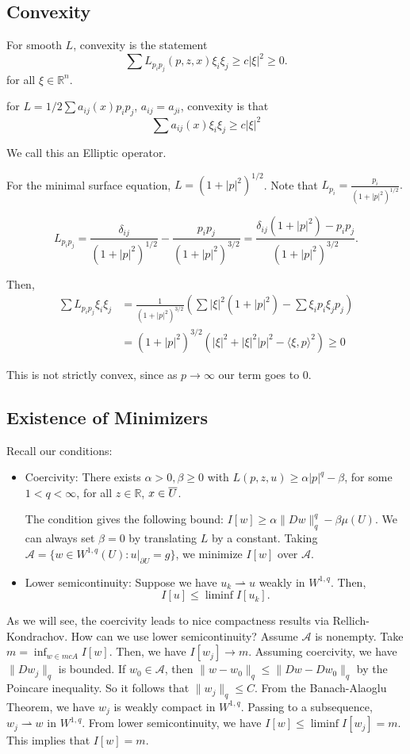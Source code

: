 \documentclass[12pt]{scrartcl}
\newcommand{\R}{\mathbb{R}}
\newcommand{\<}{\langle}
\renewcommand{\>}{\rangle}
\let \mc \mathcal
\begin{document}
\subsection{Convexity}
For smooth $L$, convexity is the statement 
$$\sum L_{p_i p_j}(p, z, x) \xi_i \xi_j \ge c|\xi|^2 \ge 0.$$
for all $\xi \in \R^n$.  
\begin{example} for $L = 1/2 \sum a_{ij}(x) p_i p_j$, $a_{ij} = a_{ji}$, convexity is that 
$$\sum a_{ij}(x) \xi_i \xi_j \ge c |\xi|^2$$

We call this an Elliptic operator.
\end{example}
\begin{example} For the minimal surface equation, $L = (1 + |p|^2)^{1/2}$.  Note that $L_{p_i} = \frac{p_i}{(1 + |p|^2)^{1/2}}.$  

$$L_{p_ip_j} = \frac{\delta_{ij}}{(1 + |p|^2)^{1/2}} - \frac{p_ip_j}{(1 + |p|^2)^{3/2}} = \frac{\delta_{ij}(1 + |p|^2) - p_ip_j}{(1 + |p|^2)^{3/2}}.$$

Then,
\begin{align*}
\sum L_{p_ip_j} \xi_i \xi_j &= \frac{1}{(1 + |p|^2)^{3/2}}\left ( \sum |\xi|^2 (1 + |p|^2) - \sum \xi_i p_i \xi_j p_j\right )\\
&= (1 + |p|^2)^{3/2} (|\xi|^2 + |\xi|^2 |p|^2 - \<\xi, p\>^2) \ge 0
\end{align*}

This is not strictly convex, since as $p \to \infty$ our term goes to $0$.
\end{example}
\subsection{Existence of Minimizers}
Recall our conditions:
\begin{itemize}
\item Coercivity: There exists $\alpha > 0, \beta \ge 0$ with $L(p, z, u) \ge \alpha |p|^q - \beta$, for some $1 < q < \infty$, for all $z \in \R$, $x \in \overline U$.  

The condition gives the following bound: $I[w] \ge \alpha \|Dw\|_q^q - \beta \mu(U)$.  We can always set $\beta = 0$ by translating $L$ by a constant.  Taking $\mc A = \{w \in W^{1, q}(U) : u\vert_{\partial U} = g\}$, we minimize $I[w]$ over $\mc A$.
\item Lower semicontinuity: Suppose we have $u_k \rightharpoonup u$ weakly in $W^{1, q}$.  Then, $$I[u] \le \liminf I[u_k].$$
\end{itemize}

As we will see, the coercivity leads to nice compactness results via Rellich-Kondrachov.  How can we use lower semicontinuity?  Assume $\mc A$ is nonempty.  Take $m = \inf_{w \in mc A} I[w]$.  Then, we have $I[w_j] \to m$.  Assuming coercivity, we have $\|Dw_j \|_q$ is bounded.  If $w_0 \in \mc A$, then $\|w - w_0\|_q \le \|Dw - Dw_0\|_q$ by the Poincare inequality.  So it follows that $\|w_j\|_q \le C$.  From the Banach-Alaoglu Theorem, we have $w_j$ is weakly compact in $W^{1, q}$.  Passing to a subsequence, $w_j \rightharpoonup w$ in $W^{1, q}$.  From lower semicontinuity, we have $I[w] \le \liminf I[w_j] = m$.  This implies that $I[w] = m$.
\end{document}
